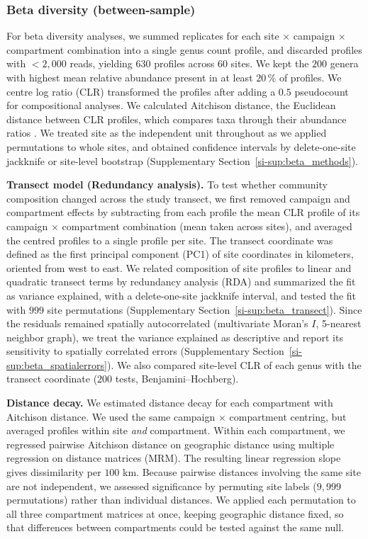 \documentclass[fleqn,10pt,numbers]{olplainarticle}
\begin{document}
\subsubsection*{Beta diversity (between-sample)}\label{sec:beta_methods}
For beta diversity analyses, we summed replicates for each site $\times$ campaign $\times$ compartment combination into a single genus count profile, and discarded profiles with $< 2{,}000$ reads, yielding $630$ profiles across $60$ sites. We kept the $200$ genera with highest mean relative abundance present in at least $20\,\%$ of profiles. We centre log ratio (CLR) transformed the profiles after adding a $0.5$ pseudocount for compositional analyses. We calculated Aitchison distance, the Euclidean distance between CLR profiles, which compares taxa through their abundance ratios \cite{tellmewhy}. We treated site as the independent unit throughout as we applied permutations to whole sites, and obtained confidence intervals by delete-one-site jackknife or site-level bootstrap (Supplementary Section~\ref{si-sup:beta_methods}).


\textbf{Transect model (Redundancy analysis).} To test whether community composition changed across the study transect, we first removed campaign and compartment effects by subtracting from each profile the mean CLR profile of its campaign $\times$ compartment combination (mean taken across sites), and averaged the centred profiles to a single profile per site. The transect coordinate was defined as the first principal component (PC1) of site coordinates in kilometers, oriented from west to east. We related composition of site profiles to linear and quadratic transect terms by redundancy analysis (RDA) \cite{legendre2012rda} and summarized the fit as variance explained, with a delete-one-site jackknife interval, and tested the fit with $999$ site permutations (Supplementary Section~\ref{si-sup:beta_transect}). Since the residuals remained spatially autocorrelated (multivariate Moran's $I$, 5-nearest neighbor graph), we treat the variance explained as descriptive and report its sensitivity to spatially correlated errors (Supplementary Section~\ref{si-sup:beta_spatialerrors}). We also compared site-level CLR of each genus with the transect coordinate ($200$ tests, Benjamini--Hochberg).

\textbf{Distance decay.} We estimated distance decay for each compartment with Aitchison distance. We used the same campaign $\times$ compartment centring, but averaged profiles within site \textit{and} compartment. Within each compartment, we regressed pairwise Aitchison distance on geographic distance using multiple regression on distance matrices (MRM). The resulting linear regression slope gives dissimilarity per $100$ km. Because pairwise distances involving the same site are not independent, we assessed significance by permuting site labels ($9{,}999$ permutations) rather than individual distances. We applied each permutation to all three compartment matrices at once, keeping geographic distance fixed, so that differences between compartments could be tested against the same null.
\end{document}
